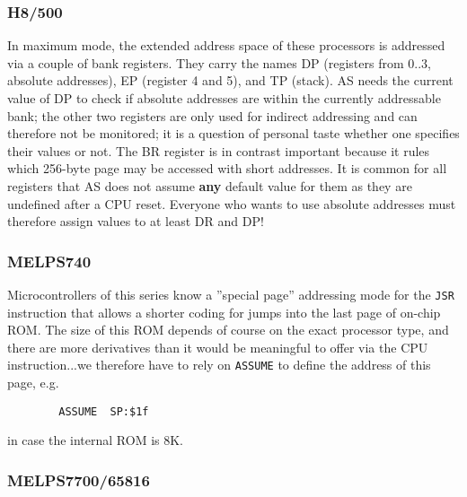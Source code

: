 \documentclass[12pt,twoside]{report}
\newcommand{\bb}[1]{{\bf #1}}
\newcommand{\tty}[1]{{\tt #1}}
\begin{document}

\subsubsection{H8/500}

In maximum mode, the extended address space of these processors is
addressed via a couple of bank registers.  They carry the names DP
(registers from 0..3, absolute addresses), EP (register 4 and 5), and TP
(stack).  AS needs the current value of DP to check if absolute addresses
are within the currently addressable bank; the other two registers are
only used for indirect addressing and can therefore not be monitored; it
is a question of personal taste whether one specifies their values or not.
The BR register is in contrast important because it rules which 256-byte
page may be accessed with short addresses.  It is common for all registers
that AS does not assume \bb{any} default value for them as they are
undefined after a CPU reset.  Everyone who wants to use absolute addresses
must therefore assign values to at least DR and DP!


\subsubsection{MELPS740}

Microcontrollers of this series know a ''special page'' addressing mode
for the \tty{JSR} instruction that allows a shorter coding for jumps into
the last page of on-chip ROM.  The size of this ROM depends of course
on the exact processor type, and there are more derivatives than it
would be meaningful to offer via the CPU instruction...we therefore
have to rely on \tty{ASSUME} to define the address of this page, e.g.
\begin{verbatim}
        ASSUME  SP:$1f
\end{verbatim}
in case the internal ROM is 8K.


\subsubsection{MELPS7700/65816}
\end{document}
